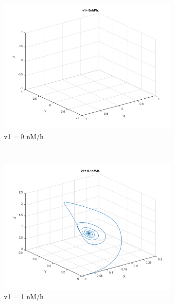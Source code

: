 \documentclass[10pt,a4paper,oneside,twocolumn]{article}
\numberwithin{equation}{section} %
\begin{document}
    \begin{figure}
    \centering
	\begin{subfigure}[b]{0.3\textwidth}
	    \includegraphics[width=\textwidth]{LotsofthesameA/A-AA0.png}
	    \caption{v1 = 0 nM/h}
	\end{subfigure}
	~ 
	\begin{subfigure}[b]{0.3\textwidth}
	    \includegraphics[width=\textwidth]{LotsofthesameA/A-AA1.png}
	    \caption{v1 = 1 nM/h}
	\end{subfigure}
	~ 
	\begin{subfigure}[b]{0.3\textwidth}

\end{subfigure}
\end{figure}
\end{document}
